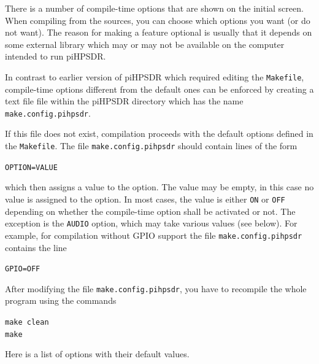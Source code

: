 \documentclass[12pt]{book}
\def\grtt#1{\texttt{\color{magenta}#1}}
\def\pH{pi\-HPSDR\xspace}
\begin{document}
There is a number of compile-time options that are shown on the initial screen.
When compiling from the sources, you can choose which options you want (or do not want).
The reason for making a feature optional is usually that it depends on some external
library which may or may not be available on the computer intended  to run \pH.

In contrast to earlier version of \pH which required editing the \texttt{Makefile},
compile-time options different from the default ones can be enforced by
creating a text file
file within the \pH directory which has the name \grtt{make.config.pihpsdr}.

If this file does not exist, compilation proceeds with the default options defined
in the \texttt{Makefile}.  The file
\grtt{make.config.pihpsdr} should contain lines of the form

\texttt{OPTION=VALUE}

which then assigns a value to the option. The value may be empty, in this case no value is assigned
to the option. In most cases, the value is either \texttt{ON} or \texttt{OFF} depending on whether
the compile-time option shall be activated or not.
The exception is the \texttt{AUDIO} option, which may take various values
(see below). For example, for compilation without GPIO support the file \grtt{make.config.pihpsdr}
contains the line

\texttt{GPIO=OFF}

After modifying the file \grtt{make.config.pihpsdr}, you have to recompile the
whole program using the commands


\grtt{make clean} \\
\grtt{make}


Here is a list of options with their default values.
\end{document}
